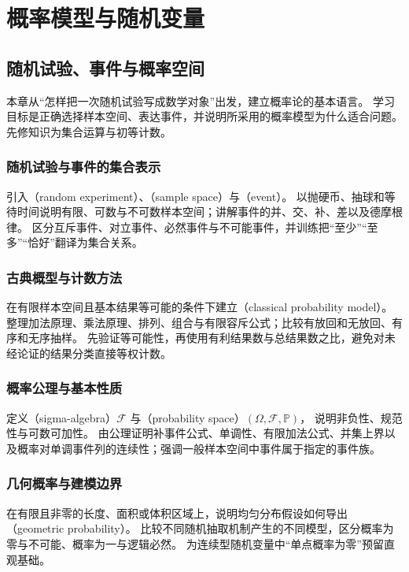 \documentclass[UTF8,12pt,a4paper,fontset=fandol]{ctexbook}
\begin{document}
\part{概率模型与随机变量}

\chapter{随机试验、事件与概率空间}
\label{chap:ps-events}

本章从“怎样把一次随机试验写成数学对象”出发，建立概率论的基本语言。
学习目标是正确选择样本空间、表达事件，并说明所采用的概率模型为什么适合问题。先修知识为集合运算与初等计数。

\section{随机试验与事件的集合表示}
\label{sec:ps-events-language}
引入（random experiment）、（sample space）与（event）。
以抛硬币、抽球和等待时间说明有限、可数与不可数样本空间；讲解事件的并、交、补、差以及德摩根律。
区分互斥事件、对立事件、必然事件与不可能事件，并训练把“至少”“至多”“恰好”翻译为集合关系。

\section{古典概型与计数方法}
\label{sec:ps-counting}
在有限样本空间且基本结果等可能的条件下建立（classical probability model）。
整理加法原理、乘法原理、排列、组合与有限容斥公式；比较有放回和无放回、有序和无序抽样。
先验证等可能性，再使用有利结果数与总结果数之比，避免对未经论证的结果分类直接等权计数。

\section{概率公理与基本性质}
\label{sec:ps-probability-axioms}
定义（sigma-algebra）$\mathcal F$ 与（probability space）$(\Omega,\mathcal F,\mathbb P)$，
说明非负性、规范性与可数可加性。
由公理证明补事件公式、单调性、有限加法公式、并集上界以及概率对单调事件列的连续性；强调一般样本空间中事件属于指定的事件族。

\section{几何概率与建模边界}
\label{sec:ps-geometric-probability}
在有限且非零的长度、面积或体积区域上，说明均匀分布假设如何导出（geometric probability）。
比较不同随机抽取机制产生的不同模型，区分概率为零与不可能、概率为一与逻辑必然。
为连续型随机变量中“单点概率为零”预留直观基础。
\end{document}
